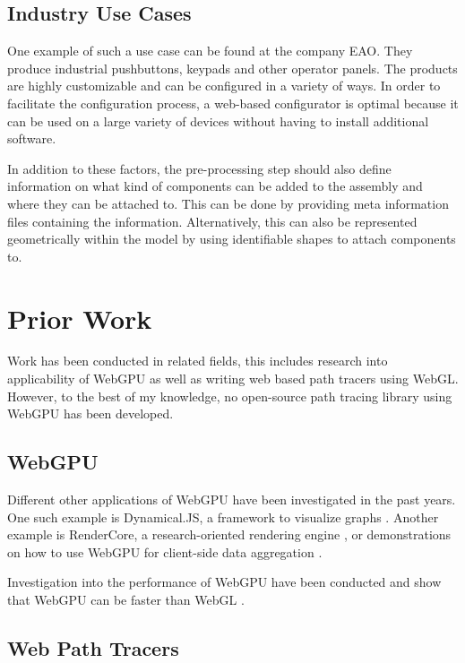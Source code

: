 \subsection{Industry Use Cases}

One example of such a use case can be found at the company EAO. They produce industrial pushbuttons, keypads and other operator panels. The products are highly customizable and can be configured in a variety of ways. In order to facilitate the configuration process, a web-based configurator is optimal because it can be used on a large variety of devices without having to install additional software.

In addition to these factors, the pre-processing step should also define information on what kind of components can be added to the assembly and where they can be attached to. This can be done by providing meta information files containing the information. Alternatively, this can also be represented geometrically within the model by using identifiable shapes to attach components to.

\section{Prior Work}

Work has been conducted in related fields, this includes research into applicability of WebGPU as well as writing web based path tracers using WebGL. However, to the best of my knowledge, no open-source path tracing library using WebGPU has been developed.

\subsection{WebGPU}

Different other applications of WebGPU have been investigated in the past years. One such example is Dynamical.JS, a framework to visualize graphs \cite{dotson2022dynamicaljs}. Another example is RenderCore, a research-oriented rendering engine \cite{Bohak_Kovalskyi_Linev_Mrak_Tadel_Strban_Tadel_Yagil_2024}, or demonstrations on how to use WebGPU for client-side data aggregation \cite{kimmersdorfer2023webgpu}.

Investigation into the performance of WebGPU have been conducted and show that WebGPU can be faster than WebGL \cite{webGPUWebGis, fransson2023performance, CHICKERUR2024919}.
 

\subsection{Web Path Tracers}

